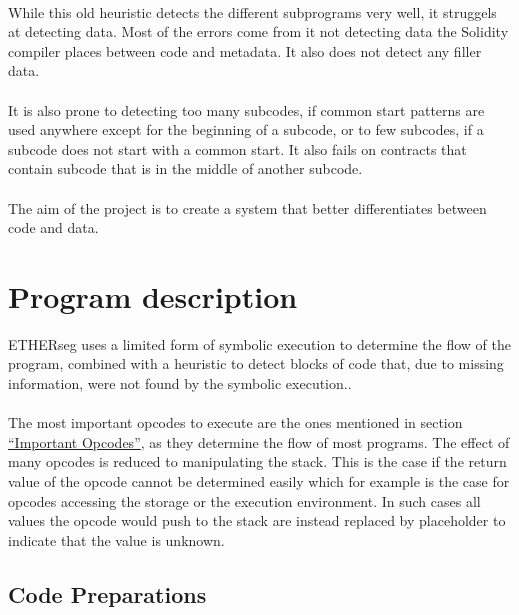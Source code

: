 \documentclass{article}
\begin{document}
\paragraph{}
    While this old heuristic detects the different subprograms very well, it struggels at detecting data. Most of the errors come from it not detecting data the Solidity compiler places between code and metadata. It also does not detect any filler data.
\paragraph{}
    It is also prone to detecting too many subcodes, if common start patterns are used anywhere except for the beginning of a subcode, or to few subcodes, if a subcode does not start with a common start. It also fails on contracts that contain subcode that is in the middle of another subcode.
\paragraph{}
    The aim of the project is to create a system that better differentiates between code and data.

\section{Program description}
\label{description}
    ETHERseg uses a limited form of symbolic execution to determine the flow of the program, combined with a heuristic to detect blocks of code that, due to missing information, were not found by the symbolic execution..
\paragraph{}
    The most important opcodes to execute are the ones mentioned in section \hyperref[opcodes]{``Important Opcodes''}, as they determine the flow of most programs. The effect of many opcodes is reduced to manipulating the stack. This is the case if the return value of the opcode cannot be determined easily which for example is the case for opcodes accessing the storage or the execution environment. In such cases all values the opcode would push to the stack are instead replaced by placeholder to indicate that the value is unknown.

\subsection{Code Preparations}
\end{document}
